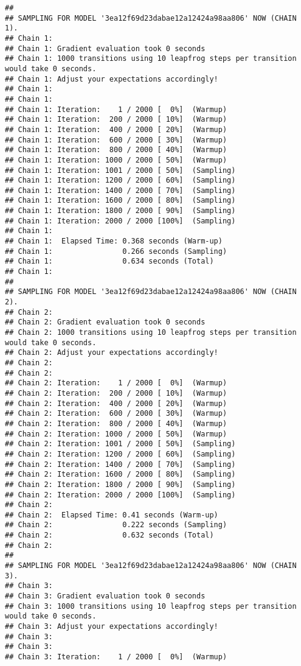 \documentclass[
]{article}
\begin{document}
\begin{verbatim}
## 
## SAMPLING FOR MODEL '3ea12f69d23dabae12a12424a98aa806' NOW (CHAIN 1).
## Chain 1: 
## Chain 1: Gradient evaluation took 0 seconds
## Chain 1: 1000 transitions using 10 leapfrog steps per transition would take 0 seconds.
## Chain 1: Adjust your expectations accordingly!
## Chain 1: 
## Chain 1: 
## Chain 1: Iteration:    1 / 2000 [  0%]  (Warmup)
## Chain 1: Iteration:  200 / 2000 [ 10%]  (Warmup)
## Chain 1: Iteration:  400 / 2000 [ 20%]  (Warmup)
## Chain 1: Iteration:  600 / 2000 [ 30%]  (Warmup)
## Chain 1: Iteration:  800 / 2000 [ 40%]  (Warmup)
## Chain 1: Iteration: 1000 / 2000 [ 50%]  (Warmup)
## Chain 1: Iteration: 1001 / 2000 [ 50%]  (Sampling)
## Chain 1: Iteration: 1200 / 2000 [ 60%]  (Sampling)
## Chain 1: Iteration: 1400 / 2000 [ 70%]  (Sampling)
## Chain 1: Iteration: 1600 / 2000 [ 80%]  (Sampling)
## Chain 1: Iteration: 1800 / 2000 [ 90%]  (Sampling)
## Chain 1: Iteration: 2000 / 2000 [100%]  (Sampling)
## Chain 1: 
## Chain 1:  Elapsed Time: 0.368 seconds (Warm-up)
## Chain 1:                0.266 seconds (Sampling)
## Chain 1:                0.634 seconds (Total)
## Chain 1: 
## 
## SAMPLING FOR MODEL '3ea12f69d23dabae12a12424a98aa806' NOW (CHAIN 2).
## Chain 2: 
## Chain 2: Gradient evaluation took 0 seconds
## Chain 2: 1000 transitions using 10 leapfrog steps per transition would take 0 seconds.
## Chain 2: Adjust your expectations accordingly!
## Chain 2: 
## Chain 2: 
## Chain 2: Iteration:    1 / 2000 [  0%]  (Warmup)
## Chain 2: Iteration:  200 / 2000 [ 10%]  (Warmup)
## Chain 2: Iteration:  400 / 2000 [ 20%]  (Warmup)
## Chain 2: Iteration:  600 / 2000 [ 30%]  (Warmup)
## Chain 2: Iteration:  800 / 2000 [ 40%]  (Warmup)
## Chain 2: Iteration: 1000 / 2000 [ 50%]  (Warmup)
## Chain 2: Iteration: 1001 / 2000 [ 50%]  (Sampling)
## Chain 2: Iteration: 1200 / 2000 [ 60%]  (Sampling)
## Chain 2: Iteration: 1400 / 2000 [ 70%]  (Sampling)
## Chain 2: Iteration: 1600 / 2000 [ 80%]  (Sampling)
## Chain 2: Iteration: 1800 / 2000 [ 90%]  (Sampling)
## Chain 2: Iteration: 2000 / 2000 [100%]  (Sampling)
## Chain 2: 
## Chain 2:  Elapsed Time: 0.41 seconds (Warm-up)
## Chain 2:                0.222 seconds (Sampling)
## Chain 2:                0.632 seconds (Total)
## Chain 2: 
## 
## SAMPLING FOR MODEL '3ea12f69d23dabae12a12424a98aa806' NOW (CHAIN 3).
## Chain 3: 
## Chain 3: Gradient evaluation took 0 seconds
## Chain 3: 1000 transitions using 10 leapfrog steps per transition would take 0 seconds.
## Chain 3: Adjust your expectations accordingly!
## Chain 3: 
## Chain 3: 
## Chain 3: Iteration:    1 / 2000 [  0%]  (Warmup)

\end{verbatim}
\end{document}
